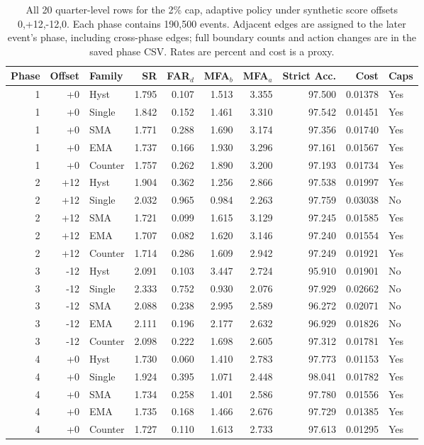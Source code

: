 \begin{table}[!htbp]
\centering
\caption{All 20 quarter-level rows for the 2\% cap, adaptive policy under synthetic score offsets 0,+12,-12,0. Each phase contains 190,500 events. Adjacent edges are assigned to the later event's phase, including cross-phase edges; full boundary counts and action changes are in the saved phase CSV. Rates are percent and cost is a proxy.}
\label{tab:supp_shift_phase_2_adaptive}
\scriptsize
\setlength{\tabcolsep}{2.6pt}
\begin{tabular}{rrlrrrrrrl}
\toprule
Phase & Offset & Family & SR & FAR$_d$ & MFA$_b$ & MFA$_a$ & Strict Acc. & Cost & Caps\\
\midrule
1 & +0 & Hyst & 1.795 & 0.107 & 1.513 & 3.355 & 97.500 & 0.01378 & Yes \\
1 & +0 & Single & 1.842 & 0.152 & 1.461 & 3.310 & 97.542 & 0.01451 & Yes \\
1 & +0 & SMA & 1.771 & 0.288 & 1.690 & 3.174 & 97.356 & 0.01740 & Yes \\
1 & +0 & EMA & 1.737 & 0.166 & 1.930 & 3.296 & 97.161 & 0.01567 & Yes \\
1 & +0 & Counter & 1.757 & 0.262 & 1.890 & 3.200 & 97.193 & 0.01734 & Yes \\
2 & +12 & Hyst & 1.904 & 0.362 & 1.256 & 2.866 & 97.538 & 0.01997 & Yes \\
2 & +12 & Single & 2.032 & 0.965 & 0.984 & 2.263 & 97.759 & 0.03038 & No \\
2 & +12 & SMA & 1.721 & 0.099 & 1.615 & 3.129 & 97.245 & 0.01585 & Yes \\
2 & +12 & EMA & 1.707 & 0.082 & 1.620 & 3.146 & 97.240 & 0.01554 & Yes \\
2 & +12 & Counter & 1.714 & 0.286 & 1.609 & 2.942 & 97.249 & 0.01921 & Yes \\
3 & -12 & Hyst & 2.091 & 0.103 & 3.447 & 2.724 & 95.910 & 0.01901 & No \\
3 & -12 & Single & 2.333 & 0.752 & 0.930 & 2.076 & 97.929 & 0.02662 & No \\
3 & -12 & SMA & 2.088 & 0.238 & 2.995 & 2.589 & 96.272 & 0.02071 & No \\
3 & -12 & EMA & 2.111 & 0.196 & 2.177 & 2.632 & 96.929 & 0.01826 & No \\
3 & -12 & Counter & 2.098 & 0.222 & 1.698 & 2.605 & 97.312 & 0.01781 & Yes \\
4 & +0 & Hyst & 1.730 & 0.060 & 1.410 & 2.783 & 97.773 & 0.01153 & Yes \\
4 & +0 & Single & 1.924 & 0.395 & 1.071 & 2.448 & 98.041 & 0.01782 & Yes \\
4 & +0 & SMA & 1.734 & 0.258 & 1.401 & 2.586 & 97.780 & 0.01556 & Yes \\
4 & +0 & EMA & 1.735 & 0.168 & 1.466 & 2.676 & 97.729 & 0.01385 & Yes \\
4 & +0 & Counter & 1.727 & 0.110 & 1.613 & 2.733 & 97.613 & 0.01295 & Yes \\
\bottomrule
\end{tabular}
\end{table}
